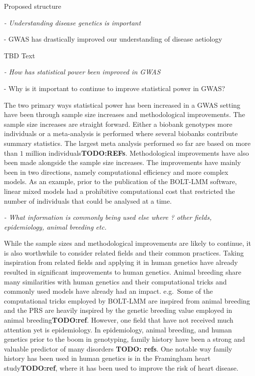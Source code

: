 Proposed structure

{\itshape
- Understanding disease genetics is important

- GWAS has drastically improved our understanding of disease aetiology}

TBD Text



{\itshape
	- How has statistical power been improved in GWAS 
	
	- Why is it important to continue to improve statistical power in GWAS?
}
The two primary ways statistical power has been increased in a GWAS setting have been through sample size increases and methodological improvements. The sample size increases are straight forward. Either a biobank genotypes more individuals or a meta-analysis is performed where several biobanks contribute summary statistics. The largest meta analysis performed so far are based on more than $ 1 $ million individuals\textbf{TODO:REFs}. Methodological improvements have also been made alongside the sample size increases. The improvements have mainly been in two directions, namely computational efficiency and more complex models. As an example, prior to the publication of the BOLT-LMM\cite{loh2015efficient} software, linear mixed models had a prohibitive computational cost that restricted the number of individuals that could be analysed at a time.%

{\itshape
- What information is commonly being used else where ? other fields, epidemiology, animal breeding etc.
}

While the sample sizes and methodological improvements are likely to continue, it is also worthwhile to consider related fields and their common practices. Taking inspiration from related fields and applying it in human genetics have already resulted in significant improvements to human genetics. Animal breeding share many similarities with human genetics and their computational tricks and commonly used models have already had an impact. e.g.\ Some of the computational tricks employed by BOLT-LMM are inspired from animal breeding and the PRS are heavily inspired by the genetic breeding value employed in animal breeding\textbf{TODO:ref}. However, one field that have not received much attention yet is epidemiology. In epidemiology, animal breeding, and human genetics prior to the boom in genotyping, family history have been a strong and valuable predictor of many disorders \textbf{TODO: refs}. One notable way family history has been used in human genetics is in the Framingham heart study\textbf{TODO:ref}, where it has been used to improve the risk of heart disease.


